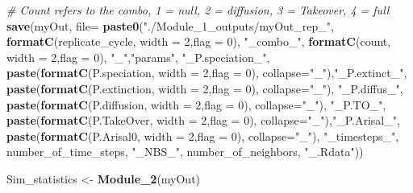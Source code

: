 \documentclass[]{book}
\newenvironment{Shaded}{\begin{snugshade}}{\end{snugshade}}
\newcommand{\KeywordTok}[1]{\textcolor[rgb]{0.13,0.29,0.53}{\textbf{{#1}}}}
\newcommand{\DataTypeTok}[1]{\textcolor[rgb]{0.13,0.29,0.53}{{#1}}}
\newcommand{\DecValTok}[1]{\textcolor[rgb]{0.00,0.00,0.81}{{#1}}}
\newcommand{\StringTok}[1]{\textcolor[rgb]{0.31,0.60,0.02}{{#1}}}
\newcommand{\CommentTok}[1]{\textcolor[rgb]{0.56,0.35,0.01}{\textit{{#1}}}}
\newcommand{\NormalTok}[1]{{#1}}
\theoremstyle{definition}
\theoremstyle{definition}
\theoremstyle{remark}
\begin{document}
\begin{Shaded}
\begin{Highlighting}[]
{{                            
    \CommentTok{# Count refers to the combo, 1 = null, 2 = diffusion, 3 = Takeover, 4 = full}
    \KeywordTok{save}\NormalTok{(myOut,  }\DataTypeTok{file=} \KeywordTok{paste0}\NormalTok{(}\StringTok{"./Module_1_outputs/myOut_rep_"}\NormalTok{,}
                              \KeywordTok{formatC}\NormalTok{(replicate_cycle, }\DataTypeTok{width =} \DecValTok{2}\NormalTok{,}\DataTypeTok{flag =} \DecValTok{0}\NormalTok{),}
                              \StringTok{"_combo_"}\NormalTok{,}
                              \KeywordTok{formatC}\NormalTok{(count, }\DataTypeTok{width =} \DecValTok{2}\NormalTok{,}\DataTypeTok{flag =} \DecValTok{0}\NormalTok{),}
                              \StringTok{"_"}\NormalTok{,}\StringTok{"params"}\NormalTok{, }\StringTok{"_P.speciation_"}\NormalTok{,}
                              \KeywordTok{paste}\NormalTok{(}\KeywordTok{formatC}\NormalTok{(P.speciation, }\DataTypeTok{width =} \DecValTok{2}\NormalTok{,}\DataTypeTok{flag =} \DecValTok{0}\NormalTok{), }\DataTypeTok{collapse=}\StringTok{"_"}\NormalTok{),}\StringTok{"_P.extinct_"}\NormalTok{,}
                              \KeywordTok{paste}\NormalTok{(}\KeywordTok{formatC}\NormalTok{(P.extinction, }\DataTypeTok{width =} \DecValTok{2}\NormalTok{,}\DataTypeTok{flag =} \DecValTok{0}\NormalTok{), }\DataTypeTok{collapse=}\StringTok{"_"}\NormalTok{), }\StringTok{"_P.diffus_"}\NormalTok{,}
                              \KeywordTok{paste}\NormalTok{(}\KeywordTok{formatC}\NormalTok{(P.diffusion, }\DataTypeTok{width =} \DecValTok{2}\NormalTok{,}\DataTypeTok{flag =} \DecValTok{0}\NormalTok{), }\DataTypeTok{collapse=}\StringTok{"_"}\NormalTok{), }\StringTok{"_P.TO_"}\NormalTok{,}
                              \KeywordTok{paste}\NormalTok{(}\KeywordTok{formatC}\NormalTok{(P.TakeOver, }\DataTypeTok{width =} \DecValTok{2}\NormalTok{,}\DataTypeTok{flag =} \DecValTok{0}\NormalTok{), }\DataTypeTok{collapse=}\StringTok{"_"}\NormalTok{),}\StringTok{"_P.Arisal_"}\NormalTok{,}
                              \KeywordTok{paste}\NormalTok{(}\KeywordTok{formatC}\NormalTok{(P.Arisal0, }\DataTypeTok{width =} \DecValTok{2}\NormalTok{,}\DataTypeTok{flag =} \DecValTok{0}\NormalTok{), }\DataTypeTok{collapse=}\StringTok{"_"}\NormalTok{),}
                              \StringTok{"_timesteps_"}\NormalTok{, number_of_time_steps, }\StringTok{"_NBS_"}\NormalTok{, number_of_neighbors, }\StringTok{"_.Rdata"}\NormalTok{))}

\NormalTok{    Sim_statistics <-}\StringTok{ }\KeywordTok{Module_2}\NormalTok{(myOut)}

}}
\end{Highlighting}
\end{Shaded}
\end{document}
